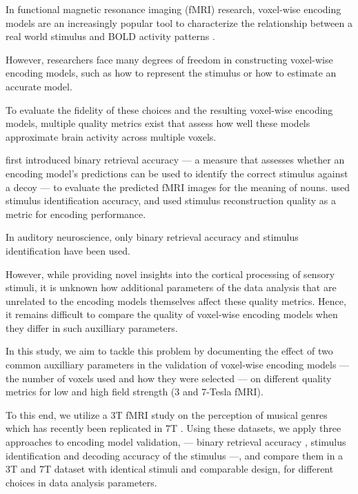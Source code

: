 In functional magnetic resonance imaging (f{MRI}) research, voxel-wise encoding
models are an increasingly popular tool to characterize the relationship
between a real world stimulus and BOLD activity patterns
\citep{TD+06,KG+08,NG11,huth2012continuous}.

However, researchers face many degrees of freedom in constructing voxel-wise encoding models, 
such as how to represent the stimulus or how to estimate an accurate model.

To evaluate the fidelity of these choices and the resulting voxel-wise encoding models,
multiple quality metrics exist that assess how well these models approximate brain activity across multiple voxels.

\citet{ML08} first introduced binary retrieval accuracy --- a measure that
assesses whether an encoding model's predictions can be used to identify the correct
stimulus against a decoy --- to evaluate the predicted f{MRI} images for the meaning
of nouns. \citet{KG+08} used stimulus identification accuracy, and \citet{NG09} used
stimulus reconstruction quality as a metric for encoding performance.

In auditory neuroscience, only binary retrieval accuracy \citep{CTK+2012,hoefle2018identifying}
and stimulus identification \citep{SF14,allen2018encoding} have been used. 

However, while providing novel insights into the cortical processing of sensory
stimuli, it is unknown how additional parameters of the data analysis that are unrelated to the encoding models themselves
affect these quality metrics.
Hence, it remains difficult to compare the quality of voxel-wise encoding models when they differ in such auxilliary parameters.

In this study, we aim to tackle this problem by documenting the effect of two common auxilliary parameters in the
validation of voxel-wise encoding models --- the number of voxels used and how they were selected --- on different
quality metrics for low and high field strength (3 and 7-Tesla f{MRI}).

To this end, we utilize a 3T f{MRI} study on the perception of musical genres
\citep{CTK+2012} which has recently been replicated in 7T \citep{HDH+2015}.
Using these datasets, we apply three approaches to encoding model
validation, --- binary retrieval accuracy \citep{ML08}, stimulus identification \citep{KG+08,SF14} and
decoding accuracy of the stimulus \citep{NG09} ---, and compare them in a 3T and 7T dataset with identical stimuli
and comparable design, for different choices in data analysis parameters.

